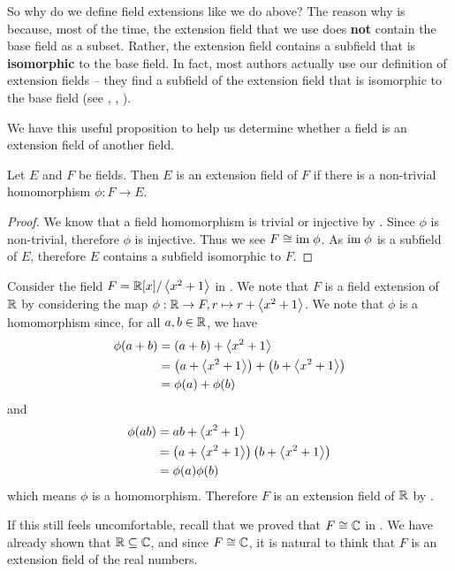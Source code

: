 So why do we define field extensions like we do above? The reason why is because, most of the time, the extension field that we use does \textbf{not} contain the base field as a subset. Rather, the extension field contains a subfield that is \textbf{isomorphic} to the base field. In fact, most authors actually use our definition of extension fields -- they find a subfield of the extension field that is isomorphic to the base field (see \cite[Theorem 13.1.3]{dummit_foote_2004}, \cite[p.~339, Proof]{gallian_2016}, \cite[Example 21.2]{judson_beezer_2022}).

We have this useful proposition to help us determine whether a field is an extension field of another field.

\begin{proposition}\label{prop-extension-field-if-homomorphism-between-fields}
    Let $E$ and $F$ be fields. Then $E$ is an extension field of $F$ if there is a non-trivial homomorphism $\phi: F \to E$.
\end{proposition}
\begin{proof}
    We know that a field homomorphism is trivial or injective by . Since $\phi$ is non-trivial, therefore $\phi$ is injective. Thus we see $F \cong \mathrm{im}\;\phi$. As $\mathrm{im}\;\phi$ is a subfield of $E$, therefore $E$ contains a subfield isomorphic to $F$.
\end{proof}

\begin{example}
    Consider the field $F = \mathbb{R}[x]/\left\langle x^2+1\right\rangle$ in . We note that $F$ is a field extension of $\mathbb{R}$ by considering the map $\phi: \mathbb{R} \to F, r \mapsto r + \left\langle x^2+1\right\rangle$. We note that $\phi$ is a homomorphism since, for all $a, b \in \mathbb{R}$, we have
    \begin{align*}
        \phi(a + b) &= (a + b) + \left\langle x^2+1\right\rangle\\
        &= \left(a + \left\langle x^2+1\right\rangle\right) + \left(b + \left\langle x^2+1\right\rangle\right)\\
        &= \phi(a) + \phi(b)
    \end{align*}
    and
    \begin{align*}
        \phi(ab) &= ab + \left\langle x^2+1\right\rangle\\
        &= \left(a + \left\langle x^2+1\right\rangle\right)\left(b + \left\langle x^2+1\right\rangle\right)\\
        &= \phi(a)\phi(b)
    \end{align*}
    which means $\phi$ is a homomorphism. Therefore $F$ is an extension field of $\mathbb{R}$ by .

    If this still feels uncomfortable, recall that we proved that $F \cong \mathbb{C}$ in . We have already shown that $\mathbb{R} \subseteq \mathbb{C}$, and since $F \cong \mathbb{C}$, it is natural to think that $F$ is an extension field of the real numbers.
\end{example}

